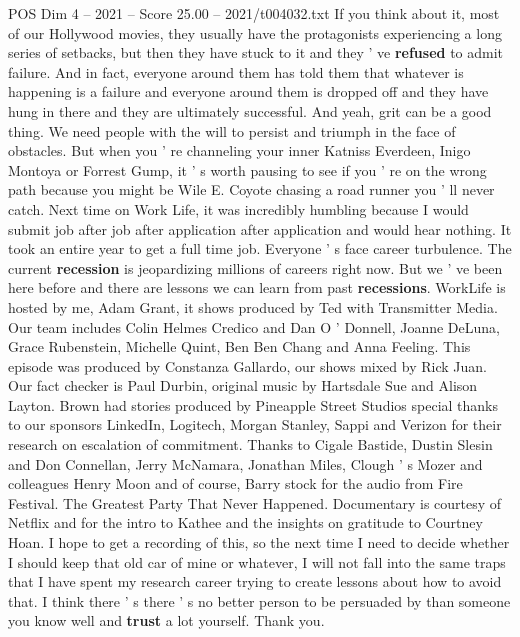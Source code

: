 \begin{textsample}{POS Dim 4 – 2021 – Score 25.00 – 2021/t004032.txt}
If you think about it, most of our Hollywood movies, they usually have the protagonists experiencing a long series of setbacks, but then they have stuck to it and they ' ve \textbf{refused} to admit failure.
And in fact, everyone around them has told them that whatever is happening is a failure and everyone around them is dropped off and they have hung in there and they are ultimately successful.
And yeah, grit can be a good thing.
We need people with the will to persist and triumph in the face of obstacles.
But when you ' re channeling your inner Katniss Everdeen, Inigo Montoya or Forrest Gump, it ' s worth pausing to see if you ' re on the wrong path because you might be Wile E.
Coyote chasing a road runner you ' ll never catch.
Next time on Work Life, it was incredibly humbling because I would submit job after job after application after application and would hear nothing.
It took an entire year to get a full time job.
Everyone ' s face career turbulence.
The current \textbf{recession} is jeopardizing millions of careers right now.
But we ' ve been here before and there are lessons we can learn from past \textbf{recessions}.
WorkLife is hosted by me, Adam Grant, it shows produced by Ted with Transmitter Media.
Our team includes Colin Helmes Credico and Dan O ' Donnell, Joanne DeLuna, Grace Rubenstein, Michelle Quint, Ben Ben Chang and Anna Feeling.
This episode was produced by Constanza Gallardo, our shows mixed by Rick Juan.
Our fact checker is Paul Durbin, original music by Hartsdale Sue and Alison Layton.
Brown had stories produced by Pineapple Street Studios special thanks to our sponsors LinkedIn, Logitech, Morgan Stanley, Sappi and Verizon for their research on escalation of commitment.
Thanks to Cigale Bastide, Dustin Slesin and Don Connellan, Jerry McNamara, Jonathan Miles, Clough ' s Mozer and colleagues Henry Moon and of course, Barry stock for the audio from Fire Festival.
The Greatest Party That Never Happened.
Documentary is courtesy of Netflix and for the intro to Kathee and the insights on gratitude to Courtney Hoan.
I hope to get a recording of this, so the next time I need to decide whether I should keep that old car of mine or whatever, I will not fall into the same traps that I have spent my research career trying to create lessons about how to avoid that.
I think there ' s there ' s no better person to be persuaded by than someone you know well and \textbf{trust} a lot yourself.
Thank you.

\end{textsample}
